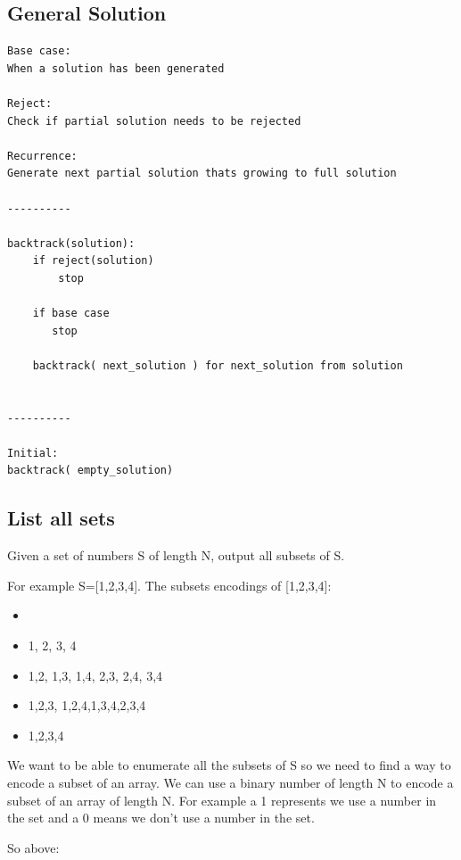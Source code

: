 \documentclass[11pt,oneside]{book}
\begin{document}
\subsection{General Solution}

\begin{lstlisting}
Base case:
When a solution has been generated

Reject:
Check if partial solution needs to be rejected

Recurrence:
Generate next partial solution thats growing to full solution

----------

backtrack(solution):
    if reject(solution)
        stop

    if base case
       stop

    backtrack( next_solution ) for next_solution from solution


----------

Initial:
backtrack( empty_solution)

\end{lstlisting}

\subsection{List all sets}

Given a set of numbers S of length N, output all subsets of S.

For example S=[1,2,3,4]. The subsets encodings of [1,2,3,4]:

\begin{itemize}
\item {}
\item {1}, {2}, {3}, {4}
\item {1,2}, {1,3}, {1,4}, {2,3}, {2,4}, {3,4}
\item {1,2,3}, {1,2,4},{1,3,4},{2,3,4}
\item {1,2,3,4}
\end{itemize}

We want to be able to enumerate all the subsets of S so we need to find a way to encode a subset of an array. We can use a binary number of length N to encode a subset of an array of length N. For example a 1 represents we use a number in the set and a 0 means we don't use a number in the set.

So above:
\end{document}
